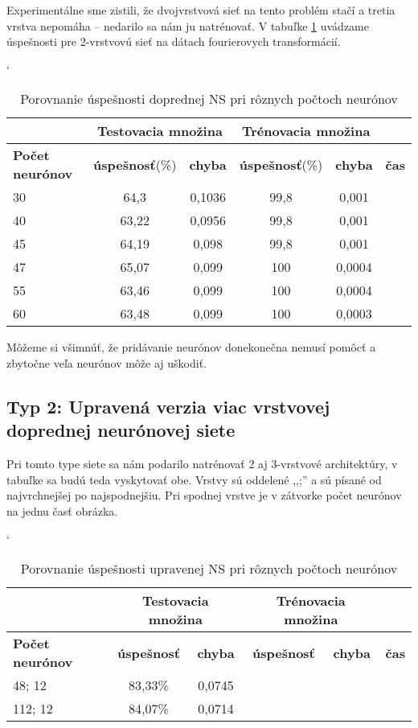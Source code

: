 Experimentálne sme zistili, že dvojvrstvová sieť na tento problém stačí a tretia vrstva nepomáha -- nedarilo sa nám ju natrénovať. V tabuľke \ref{tab:neuroncountcmp} uvádzame úspešnosti pre 2-vrstvovú sieť na dátach fourierovych transformácií.

\begin{table}[h]
\catcode` %
\centering
\begin{tabular}{|l|c|c|c|c|c|}
\cline{2-5}
\multicolumn{1}{l}{} & \multicolumn{2}{|c|}{\textbf{Testovacia množina}} & \multicolumn{2}{c|}{\textbf{Trénovacia množina}} & \multicolumn{1}{l}{}\\ 
\hline
\textbf{Počet neurónov} & \textbf{úspešnosť}(\%) & \textbf{chyba} & \textbf{úspešnosť}(\%) & \textbf{chyba} & \textbf{čas} \\ \hline
30 & 64,3 & 0,1036 & 99,8 & 0,001 &\\ \hline
40 & 63,22 & 0,0956 & 99,8 & 0,001 &\\ \hline
45 & 64,19 & 0,098 & 99,8 & 0,001 &\\ \hline
47 & 65,07 & 0,099 & 100 & 0,0004 &\\ \hline
55 & 63,46 & 0,099 & 100 & 0,0004 &\\ \hline
60 & 63,48 & 0,099 & 100 & 0,0003 &\\ 
\hline
\end{tabular}
\caption{Porovnanie úspešnosti doprednej NS pri rôznych počtoch neurónov}
\label{tab:neuroncountcmp}
\end{table}

Môžeme si všimnúť, že pridávanie neurónov donekonečna nemusí pomôcť a zbytočne veľa neurónov môže aj uškodiť.

\subsection{Typ 2: Upravená verzia viac vrstvovej doprednej neurónovej siete}

Pri tomto type siete sa nám podarilo natrénovať 2 aj 3-vrstvové architektúry, v tabuľke sa budú teda vyskytovať obe. Vrstvy sú oddelené ,,;'' a sú písané od najvrchnejšej po najspodnejšiu. Pri spodnej vrstve je v zátvorke počet neurónov na jednu časť obrázka.

\begin{table}[h]
\catcode` %
\centering
\begin{tabular}{|l|c|c|c|c|c|}
\cline{2-5}
\multicolumn{1}{l}{} & \multicolumn{2}{|c|}{\textbf{Testovacia množina}} & \multicolumn{2}{c|}{\textbf{Trénovacia množina}} & \multicolumn{1}{l}{}\\ 
\hline
\textbf{Počet neurónov} & \textbf{úspešnosť} & \textbf{chyba} & \textbf{úspešnosť} & \textbf{chyba} & \textbf{čas} \\ \hline
48; 12 & 83,33\% & 0,0745 & & &\\ \hline
112; 12 & 84,07\% & 0,0714 & & &\\
\hline
\end{tabular}
\caption{Porovnanie úspešnosti upravenej NS pri rôznych počtoch neurónov}
\label{tab:neuroncountcmp2}
\end{table}

